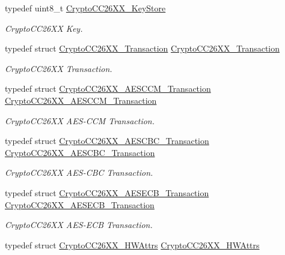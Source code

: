 \begin{DoxyCompactItemize}
typedef uint8\+\_\+t \hyperlink{_crypto_c_c26_x_x_8h_a30e647b6ad6b608b60990929200686e0}{Crypto\+C\+C26\+X\+X\+\_\+\+Key\+Store}
\begin{DoxyCompactList}\small\item\em Crypto\+C\+C26\+X\+X Key. \end{DoxyCompactList}\item 
typedef struct \hyperlink{struct_crypto_c_c26_x_x___transaction}{Crypto\+C\+C26\+X\+X\+\_\+\+Transaction} \hyperlink{_crypto_c_c26_x_x_8h_a7d5a6e41436163786d2e01c0122a3de7}{Crypto\+C\+C26\+X\+X\+\_\+\+Transaction}
\begin{DoxyCompactList}\small\item\em Crypto\+C\+C26\+X\+X Transaction. \end{DoxyCompactList}\item 
typedef struct \hyperlink{struct_crypto_c_c26_x_x___a_e_s_c_c_m___transaction}{Crypto\+C\+C26\+X\+X\+\_\+\+A\+E\+S\+C\+C\+M\+\_\+\+Transaction} \hyperlink{_crypto_c_c26_x_x_8h_a9cf6019bce243720cebc70eb8310682e}{Crypto\+C\+C26\+X\+X\+\_\+\+A\+E\+S\+C\+C\+M\+\_\+\+Transaction}
\begin{DoxyCompactList}\small\item\em Crypto\+C\+C26\+X\+X A\+E\+S-\/\+C\+C\+M Transaction. \end{DoxyCompactList}\item 
typedef struct \hyperlink{struct_crypto_c_c26_x_x___a_e_s_c_b_c___transaction}{Crypto\+C\+C26\+X\+X\+\_\+\+A\+E\+S\+C\+B\+C\+\_\+\+Transaction} \hyperlink{_crypto_c_c26_x_x_8h_ac88ef72b5742d84ef0d51ee6b0fd2fc7}{Crypto\+C\+C26\+X\+X\+\_\+\+A\+E\+S\+C\+B\+C\+\_\+\+Transaction}
\begin{DoxyCompactList}\small\item\em Crypto\+C\+C26\+X\+X A\+E\+S-\/\+C\+B\+C Transaction. \end{DoxyCompactList}\item 
typedef struct \hyperlink{struct_crypto_c_c26_x_x___a_e_s_e_c_b___transaction}{Crypto\+C\+C26\+X\+X\+\_\+\+A\+E\+S\+E\+C\+B\+\_\+\+Transaction} \hyperlink{_crypto_c_c26_x_x_8h_a49f5f56e3a3f2f1aa354067e4261533f}{Crypto\+C\+C26\+X\+X\+\_\+\+A\+E\+S\+E\+C\+B\+\_\+\+Transaction}
\begin{DoxyCompactList}\small\item\em Crypto\+C\+C26\+X\+X A\+E\+S-\/\+E\+C\+B Transaction. \end{DoxyCompactList}\item 
typedef struct \hyperlink{struct_crypto_c_c26_x_x___h_w_attrs}{Crypto\+C\+C26\+X\+X\+\_\+\+H\+W\+Attrs} \hyperlink{_crypto_c_c26_x_x_8h_a43b8004f918cfc847b65ebe981970da7}{Crypto\+C\+C26\+X\+X\+\_\+\+H\+W\+Attrs}

\end{DoxyCompactItemize}
